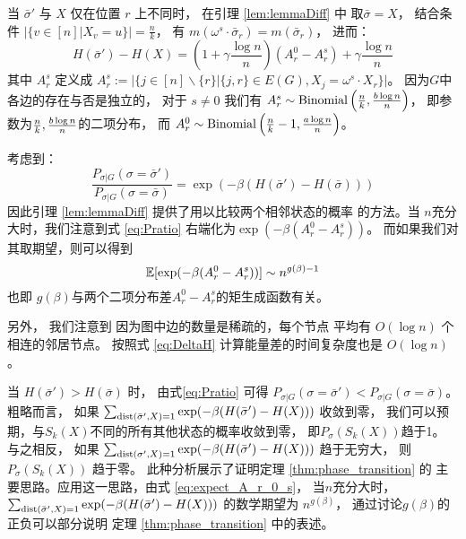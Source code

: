 \begin{remark}\label{re:energy_diff}
	当 $\bar{\sigma}'$ 与 $X$ 仅在位置 $r$
	上不同时， 在引理 \ref{lem:lemmaDiff} 中
	取$\bar{\sigma}=X$，
	结合条件  $|\{v \in [n] | X_v = u\}| = \frac{n}{k}$，
	有 $m(\omega^s \cdot \bar{\sigma}_r)
	=m(\bar{\sigma}_r)$，
	进而：
	\begin{equation}\label{eq:energy_diff}
	H(\bar{\sigma}') - H(X) = \left(1+\gamma \frac{\log n}{n} \right)
	(A^0_r - A^s_r) + \gamma\frac{\log n}{n}
	\end{equation}
	其中 $A^s_r$ 定义成
	$A^s_r := |\{j \in [n]\backslash \{r\} | \{j, r\} \in E(G), X_j = \omega^s \cdot X_r \}|$。
	因为$G$中各边的存在与否是独立的，
	对于 $s\neq 0$
	我们有 $A^s_r \sim \operatorname{Binomial} \left(
	  \frac{n}{k}, \frac{b \log n}{n} \right) $，
	  即参数为$\frac{n}{k}, \frac{b \log n}{n}$的二项分布，
	而 $A^0_r \sim \operatorname{Binomial}
	\left(
	  \frac{n}{k}-1, \frac{a \log n}{n} \right)$。	
\end{remark}
考虑到：
\begin{equation}\label{eq:Pratio}
\frac{P_{\sigma |G } (\sigma = \bar{\sigma}')}{P_{\sigma |G } (\sigma = \bar{\sigma})}
= \exp(-\beta(H(\bar{\sigma}') - H(\bar{\sigma})))
\end{equation}
因此引理 \ref{lem:lemmaDiff} 提供了用以比较两个相邻状态的概率
的方法。当 $n$充分大时，我们注意到式
\eqref{eq:Pratio} 右端化为$\exp(-\beta (A_r^0 - A_r^s))$。
而如果我们对其取期望，则可以得到
\begin{equation}\label{eq:expect_A_r_0_s}
	\operatorname{\mathbb{E}}[\exp(-\beta (A_r^0 - A_r^s))] \sim n^{g(\beta)-1}
\end{equation}
也即 $g(\beta)$与两个二项分布差$A_r^0 - A_r^s$的矩生成函数有关。



另外， 我们注意到 因为图中边的数量是稀疏的，每个节点
平均有 $O(\log n)$ 个相连的邻居节点。
按照式 \eqref{eq:DeltaH} 
计算能量差的时间复杂度也是 $O(\log n)$。

当 $H(\bar{\sigma}') > H(\bar{\sigma})$ 时， 
由式\eqref{eq:Pratio} 可得
$P_{\sigma | G}(\sigma = \bar{\sigma}')<P_{\sigma | G}(\sigma = \bar{\sigma})$。
粗略而言， 如果
$ \sum_{\operatorname{dist}(\bar{\sigma}', X)=1}\exp(-\beta(H(\bar{\sigma}') - H(X))) $
收敛到零，
我们可以预期，与$S_k(X)$不同的所有其他状态的概率收敛到零，
即$P_{\sigma}(S_k(X))$趋于1。
与之相反， 如果
$ \sum_{\operatorname{dist}(\sigma', X)=1}\exp(-\beta(H(\bar{\sigma}') - H(X))) $
趋于无穷大，
则 $P_{\sigma}(S_k(X))$ 趋于零。
此种分析展示了证明定理 \ref{thm:phase_transition} 的
主要思路。应用这一思路，由式
\eqref{eq:expect_A_r_0_s}，
当$n$充分大时，$ \sum_{\operatorname{dist}(\bar{\sigma}', X)=1}\exp(-\beta(H(\bar{\sigma}') - H(X))) $
的数学期望为 $n^{g(\beta)}$，
通过讨论$g(\beta)$的正负可以部分说明
定理 \ref{thm:phase_transition} 中的表述。

